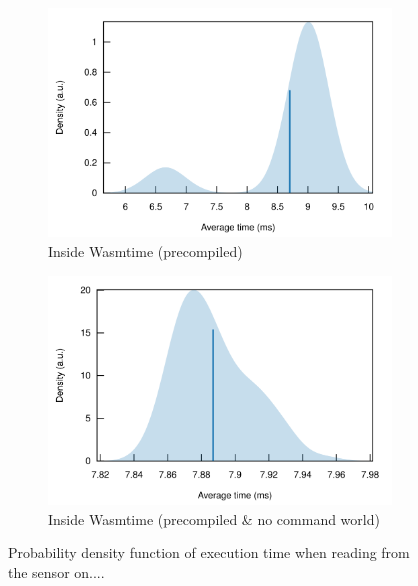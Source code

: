 \begin{figure}[h]
\begin{subfigure}{.5\textwidth}
  \centering
  \includegraphics[width=\linewidth]{figures/compiled_hat}
  \caption{Inside Wasmtime (precompiled)}
  \label{fig:hat:compiled}
\end{subfigure}%
\begin{subfigure}{.5\textwidth}
  \centering
  \includegraphics[width=\linewidth]{figures/optim_compiled_hat}
  \caption{Inside Wasmtime (precompiled \& no command world)}
  \label{fig:hat:wasmtime}
\end{subfigure}%

\caption{Probability density function of execution time when reading from the sensor on....}
\label{fig:sensor}
\end{figure}

